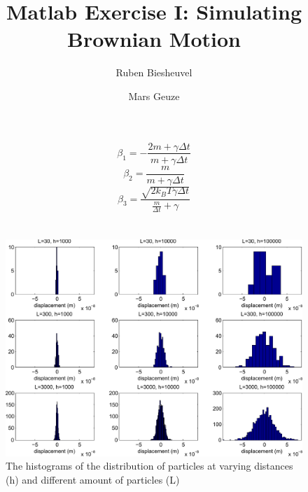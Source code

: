 \documentclass[12pt]{article}
\title{Matlab Exercise I: Simulating Brownian Motion}
\author[$\dagger$]{Ruben Biesheuvel}
\author[$\ddagger$]{Mars Geuze}
\affil[$\dagger$]{Student number 4076680}
\affil[$\ddagger$]{Student number 4109419}
\begin{document}
	\maketitle


\section{}
\begin{equation}
	\beta_1 = -\frac{2m + \gamma\Delta t}{m+\gamma\Delta t}
\end{equation}
\begin{equation}
	\beta_2 = \frac{m}{m+\gamma\Delta t}
\end{equation}
\begin{equation}
	\beta_3 = \frac{\sqrt{2k_BT\gamma\Delta t}}{\frac{m}{\Delta t}+\gamma}
\end{equation}

\newpage\section{}



\newpage\section{}



\newpage\section{}

\begin{figure}[h!]
\centering
\includegraphics[width=\textwidth]{m/Ex4-no-gaussian.pdf} 
\caption{The histograms of the distribution of particles at varying distances (h) and different amount of particles (L)}
\label{fig:nogaussian}
\end{figure}
\end{document}
